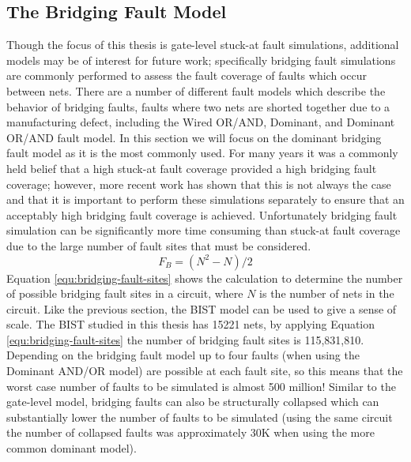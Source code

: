 \documentclass[12pt]{report}
\begin{document}
\subsection{The Bridging Fault Model}
\label{sct:bridgingfaults}
Though the focus of this thesis is gate-level stuck-at fault simulations, additional models may be of interest for future work; specifically bridging fault simulations are commonly performed to assess the fault coverage of faults which occur between nets.  There are a number of different fault models which describe the behavior of bridging faults, faults where two nets are shorted together due to a manufacturing defect, including the Wired OR/AND, Dominant, and Dominant OR/AND fault model\cite{stroud-bridging}.  In this section we will focus on the dominant bridging fault model as it is the most commonly used\cite{stroud}.  For many years it was a commonly held belief that a high stuck-at fault coverage provided a high bridging fault coverage; however, more recent work has shown that this is not always the case and that it is important to perform these simulations separately to ensure that an acceptably high bridging fault coverage is achieved\cite{stroud-bridging-physical}.  Unfortunately bridging fault simulation can be significantly more time consuming than stuck-at fault coverage due to the large number of fault sites that must be considered.
\begin{equation}
F_B = (N^2-N)/2
\label{equ:bridging-fault-sites}
\end{equation}
Equation \ref{equ:bridging-fault-sites} shows the calculation to determine the number of possible bridging fault sites in a circuit, where $N$ is the number of nets in the circuit\cite{stroud}.  Like the previous section, the BIST model can be used to give a sense of scale.  The BIST studied in this thesis has 15221 nets, by applying Equation \ref{equ:bridging-fault-sites} the number of bridging fault sites is 115,831,810.  Depending on the bridging fault model up to four faults (when using the Dominant AND/OR model\cite{stroud-bridging}) are possible at each fault site, so this means that the worst case number of faults to be simulated is almost 500 million!  Similar to the gate-level model, bridging faults can also be structurally collapsed which can substantially lower the number of faults to be simulated (using the same circuit the number of collapsed faults was approximately 30K when using the more common dominant model).
\end{document}

